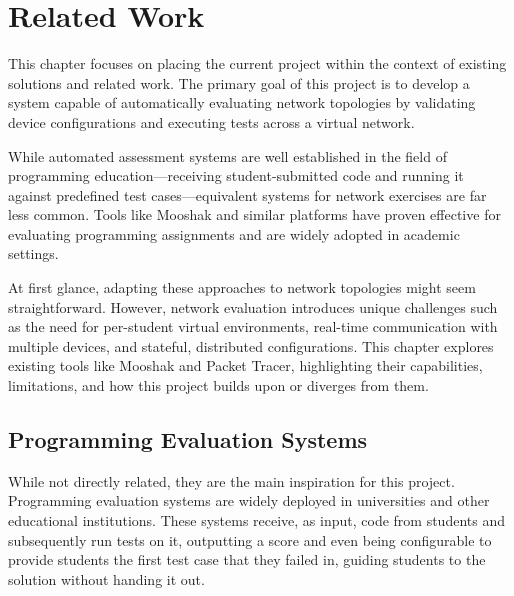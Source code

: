 
\chapter{Related Work}


\label{Chapter3RelatedWork}


This chapter focuses on placing the current project within the context of existing solutions and related work. The primary 
goal of this project is to develop a system capable of automatically evaluating network topologies by validating device 
configurations and executing tests across a virtual network.

While automated assessment systems are well established in the field of programming education—receiving student-submitted 
code and running it against predefined test cases—equivalent systems for network exercises are far less common. Tools like 
Mooshak and similar platforms have proven effective for evaluating programming assignments and are widely adopted in academic 
settings.

At first glance, adapting these approaches to network topologies might seem straightforward. However, network evaluation 
introduces unique challenges such as the need for per-student virtual environments, real-time communication with multiple 
devices, and stateful, distributed configurations. This chapter explores existing tools like Mooshak and Packet Tracer, 
highlighting their capabilities, limitations, and how this project builds upon or diverges from them.

\section{Programming Evaluation Systems}
    While not directly related, they are the main inspiration for this project. Programming evaluation systems are widely
    deployed in universities and other educational institutions. These systems receive, as input, code from students and 
    subsequently run tests on it, outputting a score and even being configurable to provide students the first test case that 
    they failed in, guiding students to the solution without handing it out.

